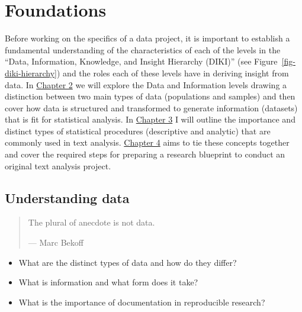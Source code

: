\documentclass[
  letterpaper,
]{scrbook}
\providecommand{\tightlist}{%
  \setlength{\itemsep}{0pt}\setlength{\parskip}{0pt}}\usepackage{longtable,booktabs,array}
\begin{document}
\part{Foundations}

Before working on the specifics of a data project, it is important to
establish a fundamental understanding of the characteristics of each of
the levels in the ``Data, Information, Knowledge, and Insight Hierarchy
(DIKI)'' (see Figure~\ref{fig-diki-hierarchy}) and the roles each of
these levels have in deriving insight from data. In
\protect\hyperlink{understanding-data-chapter}{Chapter 2} we will
explore the Data and Information levels drawing a distinction between
two main types of data (populations and samples) and then cover how data
is structured and transformed to generate information (datasets) that is
fit for statistical analysis. In
\protect\hyperlink{approaching-analysis-chapter}{Chapter 3} I will
outline the importance and distinct types of statistical procedures
(descriptive and analytic) that are commonly used in text analysis.
\protect\hyperlink{framing-research-chapter}{Chapter 4} aims to tie
these concepts together and cover the required steps for preparing a
research blueprint to conduct an original text analysis project.

\hypertarget{sec-understanding-data}{%
\chapter{Understanding data}\label{sec-understanding-data}}

\begin{quote}
The plural of anecdote is not data.

--- Marc Bekoff
\end{quote}

\begin{tcolorbox}[enhanced jigsaw, title=\textcolor{quarto-callout-note-color}{\faInfo}\hspace{0.5em}{Essential questions}, breakable, colback=white, colframe=quarto-callout-note-color-frame, bottomrule=.15mm, left=2mm, bottomtitle=1mm, colbacktitle=quarto-callout-note-color!10!white, opacityback=0, arc=.35mm, toprule=.15mm, coltitle=black, leftrule=.75mm, opacitybacktitle=0.6, toptitle=1mm, titlerule=0mm, rightrule=.15mm]

\begin{itemize}
\tightlist
\item
  What are the distinct types of data and how do they differ?
\item
  What is information and what form does it take?
\item
  What is the importance of documentation in reproducible research?
\end{itemize}

\end{tcolorbox}
\end{document}
